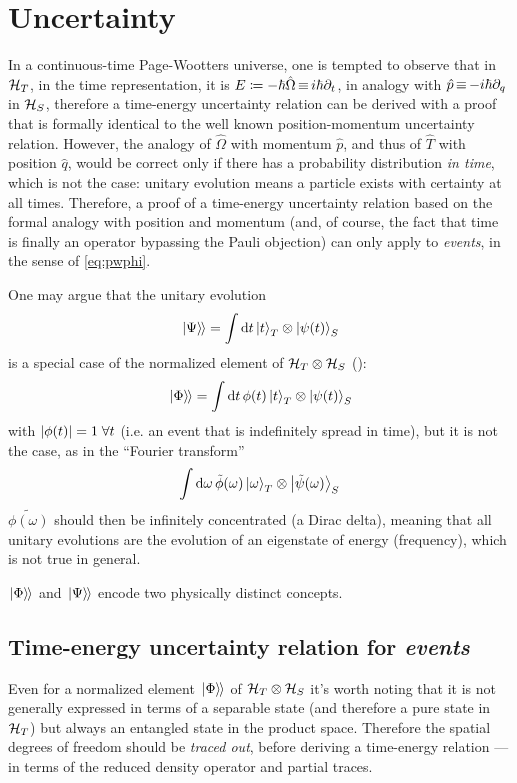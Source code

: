 \section{Uncertainty}

In a continuous-time Page-Wootters universe,
one is tempted to observe that in $\mathcal{H}_T$,
in the time representation, it is $E \coloneqq -\hbar\hat{\Omega} \operatorname*{\equiv} i\hbar\partial_{t}$,
in analogy with $\hat{p} \operatorname*{\equiv} -i\hbar\partial_{q}$ in $\mathcal{H}_S$,
therefore a time-energy uncertainty relation can be derived
with a proof that is formally identical to the well known
position-momentum uncertainty relation. However, the analogy of
$\hat{\Omega}$ with momentum $\hat{p}$,
and thus of $\hat{T}$ with position $\hat{q}$,
would be correct only if there has a probability distribution \emph{in time},
which is not the case: unitary evolution means a particle exists with
certainty at all times. Therefore, a proof of a time-energy uncertainty
relation based on the formal analogy with position and momentum
(and, of course, the fact that time is finally an operator bypassing the Pauli objection)
can only apply to \emph{events}, in the sense of \eqref{eq:pwphi}.

One may argue that the unitary evolution
\[
  \left.\left| \Psi \right\rangle\hspace{-0.115em}\right\rangle = \int \dd{t} \ket{t}_T \otimes \ket{\psi(t)}_S
\]
is a special case of the normalized element of $\mathcal{H}_T\otimes\mathcal{H}_S$ ():
\[
  \left.\left| \Phi \right\rangle\hspace{-0.115em}\right\rangle = \int \dd{t} \phi(t) \ket{t}_T \otimes \ket{\psi(t)}_S
\]
with $\abs{\phi(t)}=1 \; \forall t$ (i.e. an event that is indefinitely spread in time),
but it is not the case, as in the ``Fourier transform''
\[
  \int \dd \omega \, \tilde{\phi}(\omega) \ket{\omega}_T \otimes \ket{\tilde{\psi}(\omega)}_S
\]
$\tilde{\phi(\omega)}$ should then be infinitely concentrated (a Dirac delta),
meaning that all unitary evolutions are the evolution of an eigenstate of energy (frequency),
which is not true in general.

$\left.\left| \Phi \right\rangle\hspace{-0.115em}\right\rangle$ and $\left.\left| \Psi \right\rangle\hspace{-0.115em}\right\rangle$ encode two physically distinct concepts.

\subsection{Time-energy uncertainty relation for \emph{events}}
Even for a normalized element $\left.\left| \Phi \right\rangle\hspace{-0.115em}\right\rangle$ of $\mathcal{H}_T\otimes\mathcal{H}_S$ 
it's worth
noting that it is not generally expressed
in terms of a separable state (and therefore a pure state in $\mathcal{H}_T$)
but always an entangled state in the product space.
Therefore the spatial degrees of freedom should be \emph{traced out},
before deriving a time-energy relation 
---in terms of the reduced density operator and partial traces.

